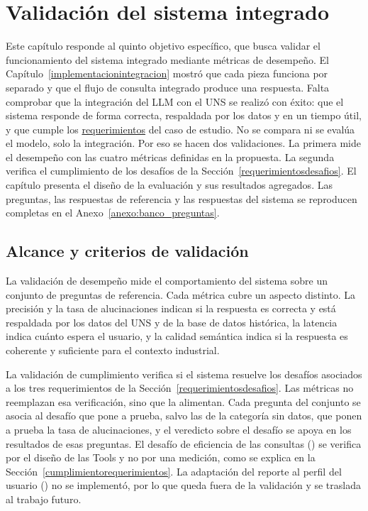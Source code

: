 \section{Validación del sistema integrado}
\label{validacionsistema}

Este capítulo responde al quinto objetivo específico, que busca validar el funcionamiento del sistema integrado mediante métricas de desempeño. El Capítulo~\ref{implementacionintegracion} mostró que cada pieza funciona por separado y que el flujo de consulta integrado produce una respuesta. Falta comprobar que la integración del LLM con el UNS se realizó con éxito: que el sistema responde de forma correcta, respaldada por los datos y en un tiempo útil, y que cumple los \hyperref[requerimientosdesafios]{requerimientos} del caso de estudio. No se compara ni se evalúa el modelo, solo la integración. Por eso se hacen dos validaciones. La primera mide el desempeño con las cuatro métricas definidas en la propuesta. La segunda verifica el cumplimiento de los desafíos de la Sección~\ref{requerimientosdesafios}. El capítulo presenta el diseño de la evaluación y sus resultados agregados. Las preguntas, las respuestas de referencia y las respuestas del sistema se reproducen completas en el Anexo~\ref{anexo:banco_preguntas}.

\subsection{Alcance y criterios de validación}
\label{alcancevalidacion}

La validación de desempeño mide el comportamiento del sistema sobre un conjunto de preguntas de referencia. Cada métrica cubre un aspecto distinto. La precisión y la tasa de alucinaciones indican si la respuesta es correcta y está respaldada por los datos del UNS y de la base de datos histórica, la latencia indica cuánto espera el usuario, y la calidad semántica indica si la respuesta es coherente y suficiente para el contexto industrial.

La validación de cumplimiento verifica si el sistema resuelve los desafíos asociados a los tres requerimientos de la Sección~\ref{requerimientosdesafios}. Las métricas no reemplazan esa verificación, sino que la alimentan. Cada pregunta del conjunto se asocia al desafío que pone a prueba, salvo las de la categoría sin datos, que ponen a prueba la tasa de alucinaciones, y el veredicto sobre el desafío se apoya en los resultados de esas preguntas. El desafío de eficiencia de las consultas () se verifica por el diseño de las Tools y no por una medición, como se explica en la Sección~\ref{cumplimientorequerimientos}. La adaptación del reporte al perfil del usuario () no se implementó, por lo que queda fuera de la validación y se traslada al trabajo futuro.

